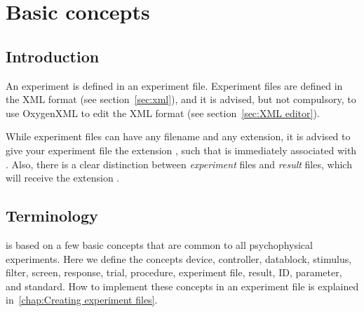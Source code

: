 \chapter{Basic concepts}
\label{chap:Basic concepts}
\section{Introduction}

An \apex experiment is defined in an experiment file. Experiment
files are defined in the XML format (see section~\ref{sec:xml}),
and it is advised, but not compulsory, to use OxygenXML to edit
the XML format (see section~\ref{sec:XML editor}).

While experiment files can have any filename and any extension, it
is advised to give your experiment file the extension
, such that is immediately associated with \apex.
Also, there is a clear distinction between \emph{experiment} files
and \emph{result} files, which will receive the extension
.






\section{Terminology}

\apex is based on a few basic concepts that are common to all
psychophysical experiments. Here we define the concepts device,
controller, datablock, stimulus, filter, screen, response, trial,
procedure, experiment file, result, ID, parameter, and standard.
How to implement these concepts in an experiment file is explained in~\ref{chap:Creating experiment files}.


